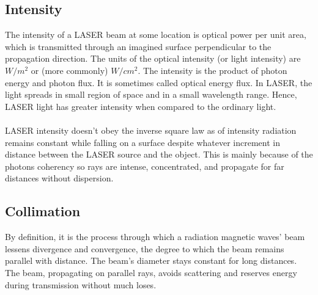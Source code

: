 \documentclass[a4paper,12pt]{article}
\begin{document}
\subsection{Intensity}
The intensity of a LASER beam at some location is optical power per unit area, which is transmitted through an imagined surface perpendicular to the propagation direction. The units of the optical intensity (or light intensity) are $W/m^2$ or (more commonly) $W/cm^2$. The intensity is the product of photon energy and photon flux. It is sometimes called optical energy flux. In LASER, the light spreads in small region of space and in a small wavelength range. Hence, LASER light has greater intensity when compared to the ordinary light.
\paragraph{}
LASER intensity doesn’t obey the inverse square law as of intensity radiation remains constant while falling on a surface despite whatever increment in distance between the LASER source and the object. This is mainly because of the photons coherency so rays are intense, concentrated, and propagate for far distances without dispersion.
\subsection{Collimation}
By definition, it is the process through which a radiation magnetic waves’ beam lessens divergence and convergence, the degree to which the beam remains parallel with distance. The beam’s diameter stays constant for long distances. The beam, propagating on parallel rays, avoids scattering and reserves energy during transmission without much loses.
 
\end{document}
